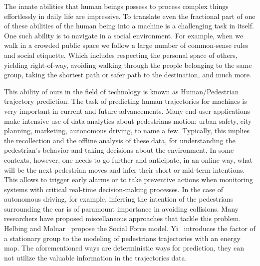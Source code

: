 The innate abilities that human beings possess to process complex things effortlessly in daily life are impressive. To translate even the fractional part of one of these abilities of the human being into a machine is a challenging task in itself. One such ability is to navigate in a social environment. For example, when we walk in a crowded public space we follow a large number of common-sense rules and social etiquette. Which includes respecting the personal space of others, yielding right-of-way, avoiding walking through the people belonging to the same group, taking the shortest path or safer path to the destination, and much more.

This ability of ours in the field of technology is known as Human/Pedestrian trajectory prediction. The task of predicting human trajectories for machines is very important in current and future advancements. Many end-user applications make intensive use of data analytics about pedestrians motion: urban safety, city planning, marketing, autonomous driving, to name a few. Typically, this implies the recollection and the offline analysis of these data, for understanding the pedestrian's behavior and taking decisions about the environment. In some contexts, however, one needs to go further and anticipate, in an online way, what will be the next pedestrian moves and infer their short or mid-term intentions. This allows to trigger early alarms or to take preventive actions when monitoring systems with critical real-time decision-making processes. In the case of autonomous driving, for example, inferring the intention of the pedestrians surrounding the car is of paramount importance in avoiding collisions. Many researchers have proposed miscellaneous approaches that tackle this problem. Helbing and Molnar~\cite{Helbing95} propose the Social Force model. Yi~\cite{Yi15} introduces the factor of a stationary group to the modeling of pedestrians trajectories with an energy map. The aforementioned ways are deterministic ways for prediction, they can not utilize the valuable information in the trajectories data.

